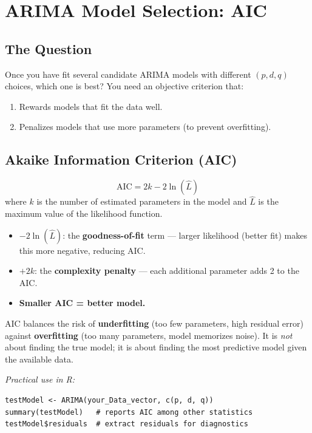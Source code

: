 \documentclass[11pt]{article}
\begin{document}
\section{ARIMA Model Selection: AIC}

\subsection{The Question}
Once you have fit several candidate ARIMA models with different $(p,d,q)$
choices, which one is best? You need an objective criterion that:
\begin{enumerate}
    \item Rewards models that fit the data well.
    \item Penalizes models that use more parameters (to prevent overfitting).
\end{enumerate}

\subsection{Akaike Information Criterion (AIC)}
\[
\text{AIC} = 2k - 2\ln(\hat{L})
\]
where $k$ is the number of estimated parameters in the model and $\hat{L}$
is the maximum value of the likelihood function.

\begin{itemize}
    \item $-2\ln(\hat{L})$: the \textbf{goodness-of-fit} term --- larger
      likelihood (better fit) makes this more negative, reducing AIC.
    \item $+2k$: the \textbf{complexity penalty} --- each additional
      parameter adds 2 to the AIC.
    \item \textbf{Smaller AIC = better model.}
\end{itemize}

AIC balances the risk of \textbf{underfitting} (too few parameters, high
residual error) against \textbf{overfitting} (too many parameters, model
memorizes noise). It is \emph{not} about finding the true model; it is about
finding the most predictive model given the available data.

\textit{Practical use in R:}
\begin{verbatim}
testModel <- ARIMA(your_Data_vector, c(p, d, q))
summary(testModel)   # reports AIC among other statistics
testModel$residuals  # extract residuals for diagnostics
\end{verbatim}
\end{document}
